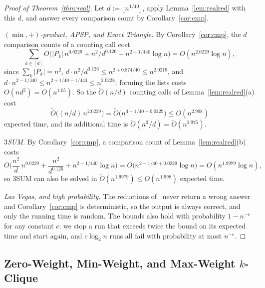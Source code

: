 \begin{proof}[Proof of Theorem~\ref{thm:real}]
Let $d:=\lfloor n^{1/40}\rfloor$, apply Lemma~\ref{lem:realred} with this $d$, and answer every comparison count by Corollary~\ref{cor:cmp}.

\emph{$(\min,+)$-product, APSP, and Exact Triangle.} By Corollary~\ref{cor:cmp}, the $d$ comparison counts of a counting call cost
\[
\sum_{k\in[d]}O\big(|P_k|\,n^{0.0229}+n^2/d^{0.126}+n^{2-1/440}\log n\big)=O(n^{2.0229}\log n),
\]
since $\sum_k|P_k|=n^2$, $d\cdot n^2/d^{0.126}\le n^{2+0.874/40}\le n^{2.0219}$, and $d\cdot n^{2-1/440}\le n^{2+1/40-1/440}\le n^{2.0228}$; forming the lists costs $O(nd^2)=O(n^{1.05})$. So the $\tilde{O}(n/d)$ counting calls of Lemma~\ref{lem:realred}(a) cost
\[
\tilde{O}\big((n/d)\,n^{2.0229}\big)=\tilde{O}\big(n^{3-1/40+0.0229}\big)\leq O(n^{2.998})
\]
expected time, and its additional time is $\tilde{O}(n^3/d)=\tilde{O}(n^{2.975})$. 


\emph{$3$SUM.} By Corollary~\ref{cor:cmp}, a comparison count of Lemma~\ref{lem:realred}(b) costs
\[
O\Big(\frac{n^2}{d}\,n^{0.0229}+\frac{n^2}{d^{0.126}}+n^{2-1/440}\log n\Big)=O\big(n^{2-1/40+0.0229}\log n\big)=O(n^{1.9979}\log n),
\]
so $3$SUM can also be solved in $\tilde{O}(n^{1.9979})\leq O(n^{1.998})$ expected time.

\emph{Las Vegas, and high probability.} The reductions of~\cite{CVX22} never return a wrong answer and Corollary~\ref{cor:cmp} is deterministic, so the output is always correct, and only the running time is random. The bounds also hold with probability $1-n^{-c}$ for any constant $c$: we stop a run that exceeds twice the bound on its expected time and start again, and $c\log_2n$ runs all fail with probability at most $n^{-c}$.
\end{proof}

\subsection{Zero-Weight, Min-Weight, and Max-Weight \texorpdfstring{$k$}{k}-Clique}\label{sec:kclique}

